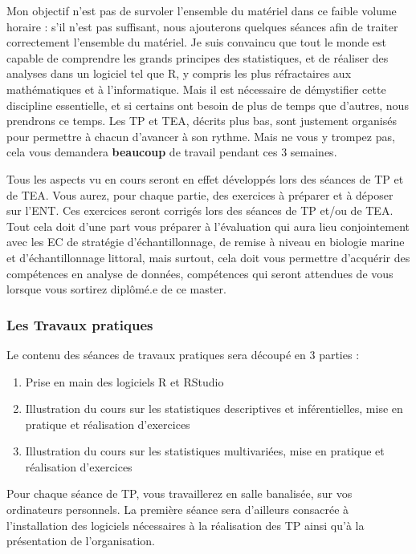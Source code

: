 \documentclass[a4paperpaper,]{article}
\providecommand{\tightlist}{%
  \setlength{\itemsep}{0pt}\setlength{\parskip}{0pt}}
\begin{document}
Mon objectif n'est pas de survoler l'ensemble du matériel dans ce faible volume horaire : s'il n'est pas suffisant, nous ajouterons quelques séances afin de traiter correctement l'ensemble du matériel. Je suis convaincu que tout le monde est capable de comprendre les grands principes des statistiques, et de réaliser des analyses dans un logiciel tel que R, y compris les plus réfractaires aux mathématiques et à l'informatique. Mais il est nécessaire de démystifier cette discipline essentielle, et si certains ont besoin de plus de temps que d'autres, nous prendrons ce temps. Les TP et TEA, décrits plus bas, sont justement organisés pour permettre à chacun d'avancer à son rythme. Mais ne vous y trompez pas, cela vous demandera \textbf{beaucoup} de travail pendant ces 3 semaines.

Tous les aspects vu en cours seront en effet développés lors des séances de TP et de TEA. Vous aurez, pour chaque partie, des exercices à préparer et à déposer sur l'ENT. Ces exercices seront corrigés lors des séances de TP et/ou de TEA. Tout cela doit d'une part vous préparer à l'évaluation qui aura lieu conjointement avec les EC de stratégie d'échantillonnage, de remise à niveau en biologie marine et d'échantillonnage littoral, mais surtout, cela doit vous permettre d'acquérir des compétences en analyse de données, compétences qui seront attendues de vous lorsque vous sortirez diplômé.e de ce master.

\hypertarget{les-travaux-pratiques}{%
\subsubsection{Les Travaux pratiques}\label{les-travaux-pratiques}}

Le contenu des séances de travaux pratiques sera découpé en 3 parties :

\begin{enumerate}
\def\labelenumi{\arabic{enumi}.}
\tightlist
\item
  Prise en main des logiciels R et RStudio
\item
  Illustration du cours sur les statistiques descriptives et inférentielles, mise en pratique et réalisation d'exercices
\item
  Illustration du cours sur les statistiques multivariées, mise en pratique et réalisation d'exercices
\end{enumerate}

Pour chaque séance de TP, vous travaillerez en salle banalisée, sur vos ordinateurs personnels. La première séance sera d'ailleurs consacrée à l'installation des logiciels nécessaires à la réalisation des TP ainsi qu'à la présentation de l'organisation.
\end{document}
